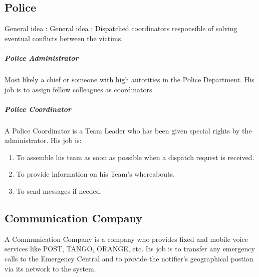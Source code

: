 \subsection{Police}
General idea : General idea : Dispatched coordinators responsible of solving
eventual conflicts between the victims.

\subparagraph{Police Administrator}
Most likely a chief or someone with high autorities in the Police Department.
His job is to assign fellow colleagues as coordinators.

\subparagraph{Police Coordinator}
A Police Coordinator is a Team Leader who has been given special
rights by the administrator. His job is:

\begin{enumerate}
\item To assemble his team as soon as possible when a dispatch request is
received.
\item To provide information on his Team's whereabouts.
\item To send messages if needed.
\end{enumerate}


\subsection{Communication Company}
A Communication Company is a company who provides fixed and mobile voice
services like POST, TANGO, ORANGE, etc. Its job is to transfer any emergency
calls to the Emergency Central and to provide the notifier's
geographical postion via its network to the system.
